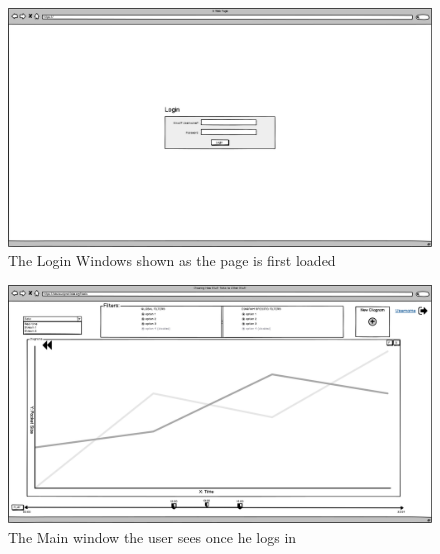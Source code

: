 \documentclass[twoside, english, draft]{Pflichtenheft}
\begin{document}
\begin{figure}[h]
\centering
\includegraphics[width=\textwidth]{Images/01MWL.png}
	\caption{The Login Windows shown as the page is first loaded}
	\label{fig:loginWindow}
\end{figure}


\begin{figure}[ht]
\centering
\includegraphics[width=\textwidth]{Images/02MW.png}
	\caption{The Main window the user sees once he logs in}
	\label{fig:mainWindow0}
\end{figure}
\vfill
\clearpage
\end{document}
